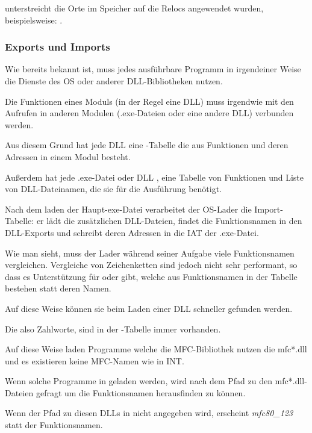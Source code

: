 \myindex{\olly}
\olly unterstreicht die Orte im Speicher auf die Relocs angewendet wurden,
beispielsweise: .

\subsubsection{Exports und Imports}

\label{PE_exports_imports}
Wie bereits bekannt ist, muss jedes ausführbare Programm in irgendeiner Weise die
Dienste des \ac{OS} oder anderer DLL-Bibliotheken nutzen.

Die Funktionen eines Moduls (in der Regel eine DLL) muss irgendwie mit den Aufrufen
in anderen Modulen (.exe-Dateien oder eine andere DLL) verbunden werden.

Aus diesem Grund hat jede DLL eine -Tabelle die aus Funktionen und deren
Adressen in einem Modul besteht.

Außerdem hat jede .exe-Datei oder DLL , eine Tabelle von Funktionen und
Liste von DLL-Dateinamen, die sie für die Ausführung benötigt.

Nach dem laden der Haupt-exe-Datei verarbeitet der \ac{OS}-Lader die Import-Tabelle:
er lädt die zusätzlichen DLL-Dateien, findet die Funktionsnamen in den DLL-Exports
und schreibt deren Adressen in die \ac{IAT} der .exe-Datei.


Wie man sieht, muss der Lader während seiner Aufgabe viele Funktionsnamen vergleichen.
Vergleiche von Zeichenketten sind jedoch nicht sehr performant, so dass es Unterstützung
für  oder  gibt, welche aus Funktionsnamen in der Tabelle
bestehen statt deren Namen.

Auf diese Weise können sie beim Laden einer DLL schneller gefunden werden.

Die  also Zahlworte, sind in der -Tabelle immer vorhanden.

Auf diese Weise laden Programme welche die \ac{MFC}-Bibliothek nutzen die mfc*.dll
und es existieren keine \ac{MFC}-Namen wie in \ac{INT}.

Wenn solche Programme in \IDA geladen werden, wird nach dem Pfad zu den mfc*.dll-Dateien
gefragt um die Funktionsnamen herausfinden zu können.

Wenn der Pfad zu diesen DLLs in \IDA nicht angegeben wird, erscheint \emph{mfc80\_123}
statt der Funktionsnamen.

